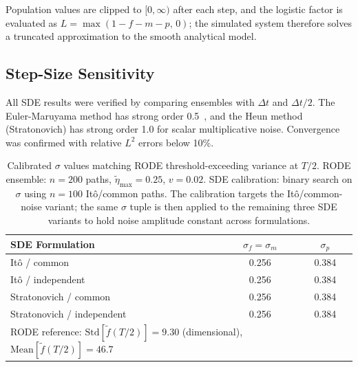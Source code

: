 \documentclass[12pt]{article}
\begin{document}
Population values are clipped to $[0, \infty)$ after each step, and the
logistic factor is evaluated as $L = \max(1 - f - m - p,\, 0)$; the
simulated system therefore solves a truncated approximation to the smooth
analytical model.

\subsection{Step-Size Sensitivity}
All SDE results were verified by comparing ensembles with $\Delta t$ and $\Delta t/2$.  The Euler-Maruyama method has strong order 0.5~\citep{KloedenPlaten1992}, and the Heun method (Stratonovich) has strong order 1.0 for scalar multiplicative noise.  Convergence was confirmed with relative $L^2$ errors below 10\%.



\begin{table}[ht]
\centering
\caption{Calibrated $\sigma$ values matching RODE threshold-exceeding
variance at $T/2$. RODE ensemble: $n=200$ paths, $\tilde\eta_{\max}=0.25$,
$v=0.02$. SDE calibration: binary search on $\sigma$ using $n=100$
It\^{o}/common paths.  The calibration targets the It\^{o}/common-noise
variant; the same $\sigma$ tuple is then applied to the remaining three
SDE variants to hold noise amplitude constant across formulations.}
\label{tab:calibration}
\begin{tabular}{lcc}
\hline
SDE Formulation & $\sigma_f = \sigma_m$ & $\sigma_p$ \\
\hline
It\^{o} / common          & 0.256 & 0.384 \\
It\^{o} / independent     & 0.256 & 0.384 \\
Stratonovich / common      & 0.256 & 0.384 \\
Stratonovich / independent & 0.256 & 0.384 \\
\hline
\multicolumn{3}{l}{\footnotesize RODE reference:
  $\mathrm{Std}[\tilde{f}(T/2)] = 9.30$ (dimensional),
  $\mathrm{Mean}[\tilde{f}(T/2)] = 46.7$} \\
\hline
\end{tabular}
\end{table}
\end{document}
